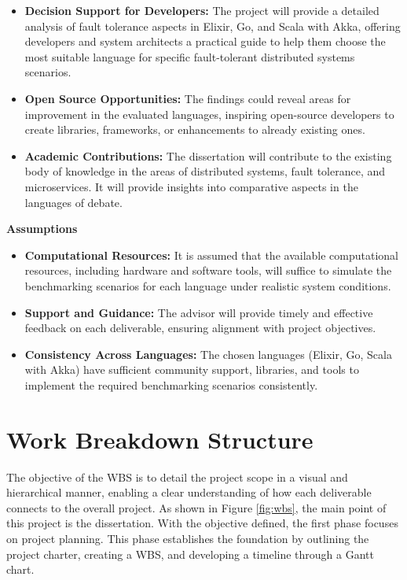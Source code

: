 \begin{itemize}
      \item \textbf{Decision Support for Developers:}
            The project will provide a detailed analysis of fault tolerance aspects in Elixir, Go, and Scala with Akka, offering developers and system architects a practical guide to help them choose the most suitable language for specific fault-tolerant distributed systems scenarios.

      \item \textbf{Open Source Opportunities:}
            The findings could reveal areas for improvement in the evaluated languages, inspiring open-source developers to create libraries, frameworks, or enhancements to already existing ones.

      \item \textbf{Academic Contributions:}
            The dissertation will contribute to the existing body of knowledge in the areas of distributed systems, fault tolerance, and microservices. It will provide insights into comparative aspects in the languages of debate.

\end{itemize}

\noindent \textbf{Assumptions}

\begin{itemize}
      \item \textbf{Computational Resources:}
            It is assumed that the available computational resources, including hardware and software tools, will suffice to simulate the benchmarking scenarios for each language under realistic system conditions.

      \item \textbf{Support and Guidance:}
            The advisor will provide timely and effective feedback on each deliverable, ensuring alignment with project objectives.

      \item \textbf{Consistency Across Languages:}
            The chosen languages (Elixir, Go, Scala with Akka) have sufficient community support, libraries, and tools to implement the required benchmarking scenarios consistently.
\end{itemize}

\section{Work Breakdown Structure}

The objective of the \gls{WBS} is to detail the project scope in a visual and hierarchical manner, enabling a clear understanding of how each deliverable connects to the overall project.
As shown in Figure \ref{fig:wbs}, the main point of this project is the dissertation. With the objective defined, the first phase focuses on project planning. This phase establishes the foundation by outlining the project charter, creating a \gls{WBS}, and developing a timeline through a Gantt chart.

